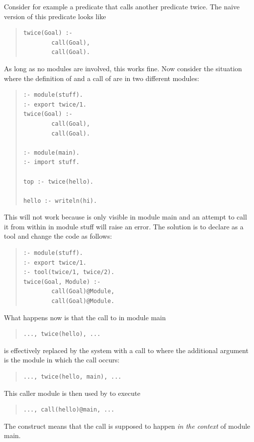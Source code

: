 Consider for example a predicate that calls another predicate twice.
The naive version of this predicate looks like
\begin{quote}
\begin{verbatim}
twice(Goal) :-
        call(Goal),
        call(Goal).
\end{verbatim}
\end{quote}
As long as no modules are involved, this works fine.
Now consider the situation where the definition of  and a
call of  are in two different modules:
\begin{quote}
\begin{verbatim}
:- module(stuff).
:- export twice/1.
twice(Goal) :-
        call(Goal),
        call(Goal).

:- module(main).
:- import stuff.

top :- twice(hello).

hello :- writeln(hi).
\end{verbatim}
\end{quote}
This will not work because  is only visible in module main
and an attempt to call it from within  in module stuff will
raise an error. The solution is to declare  as a tool and
change the code as follows:
\begin{quote}
\begin{verbatim}
:- module(stuff).
:- export twice/1.
:- tool(twice/1, twice/2).
twice(Goal, Module) :-
        call(Goal)@Module,
        call(Goal)@Module.
\end{verbatim}
\end{quote}
What happens now is that the call to  in module main
\begin{quote}
\begin{verbatim}
..., twice(hello), ...
\end{verbatim}
\end{quote}
is effectively replaced by the system with a call to  where
the additional argument is the module in which the call occurs:
\begin{quote}
\begin{verbatim}
..., twice(hello, main), ...
\end{verbatim}
\end{quote}
This caller module is then used by  to execute
\begin{quote}
\begin{verbatim}
..., call(hello)@main, ...
\end{verbatim}
\end{quote}
The
%
 construct means that the call is supposed
to happen \emph{in the context} of module main.


